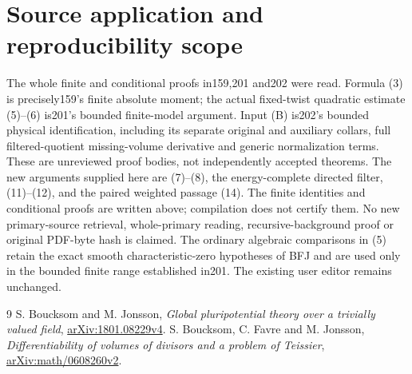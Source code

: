 \documentclass[11pt]{article}
\begin{document}
\section{Source application and reproducibility scope}
The whole finite and conditional proofs in159,201 and202 were
read. Formula (3) is precisely159's finite absolute moment;
the actual fixed-twist quadratic estimate (5)--(6) is201's
bounded finite-model argument. Input (B) is202's bounded physical
identification, including its separate original and auxiliary
collars, full filtered-quotient missing-volume derivative and
generic normalization terms. These are unreviewed proof bodies,
not independently accepted theorems.
The new arguments supplied here are (7)--(8), the energy-complete
directed filter, (11)--(12), and the paired weighted passage
(14). The finite identities and conditional proofs are written
above; compilation does not certify them.
No new primary-source retrieval, whole-primary reading,
recursive-background proof or original PDF-byte hash is claimed.
The ordinary algebraic comparisons in (5) retain the exact
smooth characteristic-zero hypotheses of BFJ and are used
only in the bounded finite range established in201.
The existing user editor remains unchanged.
\begin{thebibliography}{9}
 S. Boucksom and M. Jonsson,
\emph{Global pluripotential theory over a trivially valued field},
\href{https://arxiv.org/pdf/1801.08229v4}{arXiv:1801.08229v4}.
 S. Boucksom, C. Favre and M. Jonsson,
\emph{Differentiability of volumes of divisors and a problem of Teissier},
\href{https://arxiv.org/html/math/0608260v2}{arXiv:math/0608260v2}.
\end{thebibliography}
\end{document}
